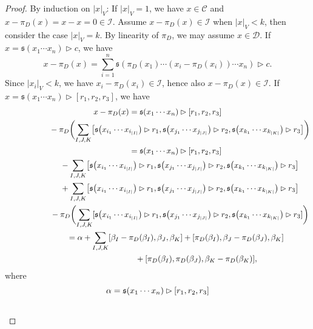 \documentclass[pdftex]{sigma}
\numberwithin{equation}{section}
\begin{document}
\begin{proof} By induction on $|x|_V$: If $|x|_V=1$, we have $x \in \mathcal{C}$ and $x-\pi_D(x) = x-x =0 \in \mathcal{I}$. Assume $x-\pi_D(x) \in \mathcal{I}$ when $|x|_V <k$, then consider the case $|x|_V=k$. By linearity of $\pi_D$, we may assume $x \in \mathcal{D}$. If $x = \mathfrak{s}(x_1 \cdots x_n) \rhd c$, we have
\[
x - \pi_D(x) = \sum_{i=1}^n \mathfrak{s}(\pi_D(x_1) \cdots (x_i-\pi_D(x_i)) \cdots x_n) \rhd c.
\]
Since $|x_i|_V < k$, we have $x_i - \pi_D(x_i) \in \mathcal{I}$, hence also $x-\pi_D(x) \in \mathcal{I}$. If $x = \mathfrak{s}(x_1 \cdots x_n) \rhd [r_1, r_2, r_3]$, we have
\begin{gather*}
 x - \pi_D(x) = \mathfrak{s}(x_1 \cdots x_n) \rhd [r_1, r_2, r_3] \\ \hphantom{x - \pi_D(x) =}{}
 - \pi_D \biggl( \sum_{I,J,K} \bigl[\mathfrak{s}\bigl(x_{i_1} \cdots x_{i_{|I|}}\bigr) \rhd r_1, \mathfrak{s}\bigl(x_{j_1} \cdots x_{j_{|J|}}\bigr) \rhd r_2, \mathfrak{s}\bigl(x_{k_1} \cdots x_{k_{|K|}}\bigr) \rhd r_3\bigr] \biggr) \\ \hphantom{x - \pi_D(x) }{}
 = \mathfrak{s}(x_1 \cdots x_n) \rhd [r_1, r_2, r_3] \\ \hphantom{x - \pi_D(x) =}{}
 - \sum_{I,J,K} \bigl[\mathfrak{s}\bigl(x_{i_1} \cdots x_{i_{|I|}}\bigr) \rhd r_1, \mathfrak{s}\bigl(x_{j_1} \cdots x_{j_{|J|}}\bigr) \rhd r_2, \mathfrak{s}\bigl(x_{k_1} \cdots x_{k_{|K|}}\bigr) \rhd r_3\bigr] \\ \hphantom{x - \pi_D(x) =}{}
 + \sum_{I,J,K} \bigl[\mathfrak{s}\bigl(x_{i_1} \cdots x_{i_{|I|}}\bigr) \rhd r_1, \mathfrak{s}\bigl(x_{j_1} \cdots x_{j_{|J|}}\bigr) \rhd r_2, \mathfrak{s}\bigl(x_{k_1} \cdots x_{k_{|K|}}\bigr) \rhd r_3\bigr] \\ \hphantom{x - \pi_D(x) =}{}
 - \pi_D \biggl( \sum_{I,J,K} [\mathfrak{s}\bigl(x_{i_1} \cdots x_{i_{|I|}}\bigr) \rhd r_1, \mathfrak{s}\bigl(x_{j_1} \cdots x_{j_{|J|}}\bigr) \rhd r_2, \mathfrak{s}\bigl(x_{k_1} \cdots x_{k_{|K|}}\bigr) \rhd r_3] \biggr) \\ \hphantom{x - \pi_D(x)}{}
 = \alpha + \sum_{I,J,K} [\beta_I - \pi_D(\beta_I),\beta_J, \beta_K] + [\pi_D(\beta_I), \beta_J - \pi_D(\beta_J), \beta_K] \\ \hphantom{x - \pi_D(x) =\alpha + \sum_{I,J,K}}{}
 + [\pi_D(\beta_I), \pi_D(\beta_J), \beta_K -\pi_D(\beta_K)],
\end{gather*}
where
\begin{gather*}
\alpha = \mathfrak{s}(x_1 \cdots x_n) \rhd [r_1, r_2, r_3] \\ \hphantom{\alpha =}{}

\end{gather*}
\end{proof}
\end{document}
